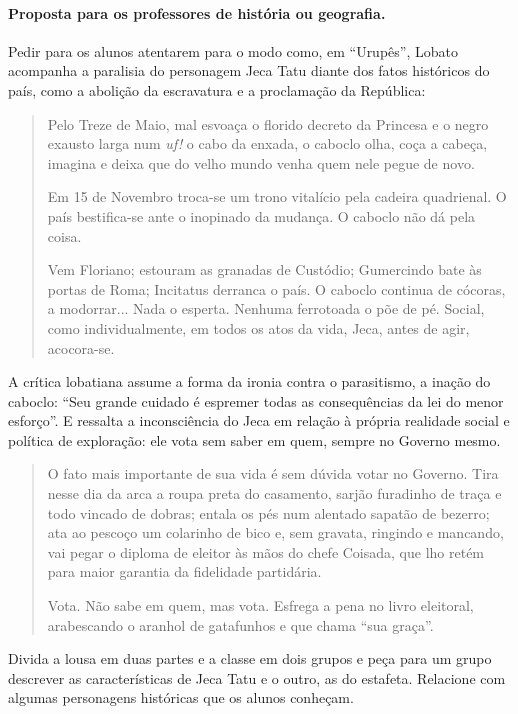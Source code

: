 \documentclass[11pt]{extarticle}
\begin{document}
\paragraph{Proposta para os professores de história ou geografia.}

Pedir para os alunos atentarem para o modo como, em ``Urupês'', Lobato
acompanha a paralisia do personagem Jeca Tatu diante dos fatos
históricos do país, como a abolição da escravatura e a proclamação da
República:

\begin{quote}
Pelo Treze de Maio, mal esvoaça o florido decreto da Princesa e o negro
exausto larga num \emph{uf!} o cabo da enxada, o caboclo olha, coça a
cabeça, imagina e deixa que do velho mundo venha quem nele pegue de
novo.

Em 15 de Novembro troca-se um trono vitalício pela cadeira quadrienal. O
país bestifica-se ante o inopinado da mudança. O caboclo não dá pela
coisa.

Vem Floriano; estouram as granadas de Custódio; Gumercindo bate às
portas de Roma; Incitatus derranca o país. O caboclo continua de
cócoras, a modorrar... Nada o esperta. Nenhuma ferrotoada o põe de pé.
Social, como individualmente, em todos os atos da vida, Jeca, antes de
agir, acocora-se.
\end{quote}

A crítica lobatiana assume a forma da ironia contra o parasitismo, a
inação do caboclo: ``Seu grande cuidado é espremer todas as
consequências da lei do menor esforço''. E ressalta a inconsciência do
Jeca em relação à própria realidade social e política de exploração: ele
vota sem saber em quem, sempre no Governo mesmo.

\begin{quote}
O fato mais importante de sua vida é sem dúvida votar no Governo. Tira
nesse dia da arca a roupa preta do casamento, sarjão furadinho de traça
e todo vincado de dobras; entala os pés num alentado sapatão de bezerro;
ata ao pescoço um colarinho de bico e, sem gravata, ringindo e mancando,
vai pegar o diploma de eleitor às mãos do chefe Coisada, que lho retém
para maior garantia da fidelidade partidária.

Vota. Não sabe em quem, mas vota. Esfrega a pena no livro eleitoral,
arabescando o aranhol de gatafunhos e que chama ``sua graça''.
\end{quote}

Divida a lousa em duas partes e a classe em dois grupos e peça para um
grupo descrever as características de 
Jeca Tatu e o outro, as do estafeta. Relacione com algumas personagens
históricas que os alunos conheçam. 
\end{document}
